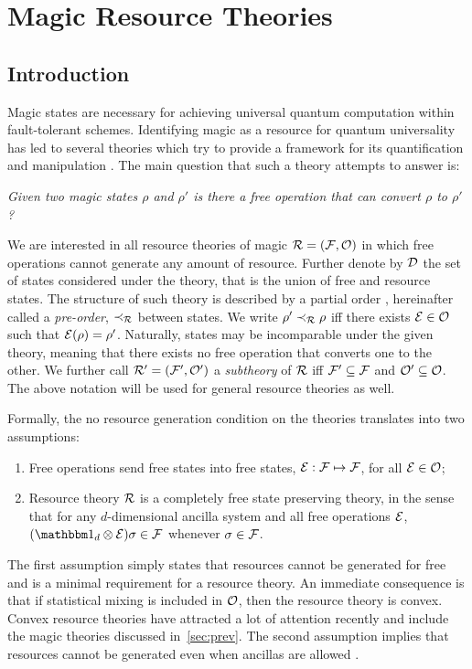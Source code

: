 \documentclass[pra,
aps,
twocolumn,
superscriptaddress,
groupedaddress,
nofootinbib,
reprint
]{revtex4-1}
\begin{document}

\section{Magic Resource Theories}
\label{sec:magic}

\subsection{Introduction}

Magic states are necessary for achieving universal quantum computation within fault-tolerant schemes.
Identifying magic as a resource for quantum universality has led to several theories which try to provide a framework for its quantification and manipulation .
The main question that such a theory attempts to answer is:
\begin{center}
    \emph{Given two magic states $\rho$ and $\rho'$ is there a free operation that can convert $\rho$ to $\rho'$?}
\end{center}

We are interested in all resource theories of magic $\mathcal{R} = (\mathcal{F}, \mathcal{O})$ in which free operations cannot generate any amount of resource. 
Further denote by $\mathcal{D}$ the set of states considered under the theory, that is the union of free and resource states.
The structure of such theory is described by a partial order , hereinafter called a \emph{pre-order}, $\prec_{\mathcal{R}}$ between states.
We write $\rho' \prec_{\mathcal{R}} \rho$ iff there exists $\mathcal{E} \in \mathcal{O}$ such that $\mathcal{E}(\rho) = \rho'$.
Naturally, states may be incomparable under the given theory, meaning that there exists no free operation that converts one to the other.
We further call $\mathcal{R}' = (\mathcal{F}', \mathcal{O}')$ a \emph{subtheory} of $\mathcal{R}$ iff $\mathcal{F}' \subseteq \mathcal{F}$ and $\mathcal{O}' \subseteq \mathcal{O}$. 
The above notation will be used for general resource theories as well.

Formally, the no resource generation condition on the theories translates into two assumptions:
\begin{enumerate}[I]
    \item Free operations send free states into free states, $\mathcal{E}: \mathcal{F} \mapsto \mathcal{F}$, for all $\mathcal{E} \in \mathcal{O}$;
    \item Resource theory $\mathcal{R}$ is a completely free state preserving theory, in the sense that for any $d$-dimensional ancilla system and all free operations $\mathcal{E}$, $(\id_d \otimes \E ) \sigma \in \F$ whenever $\sigma \in \mathcal{F}$.
\end{enumerate}
The first assumption simply states that resources cannot be generated for free and is a minimal requirement for a resource theory. 
An immediate consequence is that if statistical mixing is included in $\mathcal{O}$, then the resource theory is convex.
Convex resource theories have attracted a lot of attention recently  and include the magic theories discussed in~\cref{sec:prev}.
The second assumption implies that resources cannot be generated even when ancillas are allowed .
\end{document}
